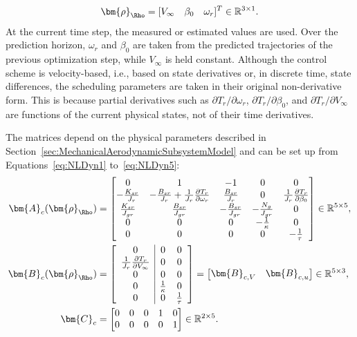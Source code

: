 \[
\bm{\rho}_\Rho = [V_{\infty} \quad \beta_0 \quad \omega_{r}]^T \in \mathbb{R}^{3 \times 1}.
\]
At the current time step, the measured or estimated values are used. Over the prediction horizon, $\omega_r$ and $\beta_0$ are taken from the predicted trajectories of the previous optimization step, while $V_{\infty}$ is held constant. Although the control scheme is velocity-based, i.e., based on state derivatives or, in discrete time, state differences, the scheduling parameters are taken in their original non-derivative form. This is because partial derivatives such as \( \partial T_r / \partial \omega_r \), \( \partial T_r / \partial \beta_0 \), and \( \partial T_r / \partial V_{\infty} \) are functions of the current physical states, not of their time derivatives.

The matrices depend on the physical parameters described in Section~\ref{sec:MechanicalAerodynamicSubsystemModel} and can be set up from Equations~\eqref{eq:NLDyn1} to~\eqref{eq:NLDyn5}:
\begin{equation}
    \begin{aligned}
        \bm{A}_c(\bm{\rho}_{\Rho}) &=
        \begin{bmatrix}
            0  & 1 & -1 & 0 & 0 \\ 
            -\frac{K_{sr}}{J_r}  & -\frac{B_{sr}}{J_r} + \frac{1}{J_r}\frac{\partial T_r}{\partial{\omega_r}} & \frac{B_{sr}}{J_r} & 0 & \frac{1}{J_r}\frac{\partial T_r}{\partial \beta_0} \\
            \frac{K_{sr}}{J_{gr}} & \frac{B_{sr}}{J_{gr}} & -\frac{B_{sr}}{J_{gr}} & -\frac{N_g}{J_{gr}} & 0 \\ 
            0 & 0 & 0 & -\frac{1}{\kappa} & 0 \\ 
            0 & 0 & 0 & 0 & -\frac{1}{\tau} 
        \end{bmatrix} \in \mathbb{R}^{5 \times 5},\\
        \bm{B}_c(\bm{\rho}_{\Rho}) &=
        \left[
        \begin{array}{c|cc}
            0 & 0 & 0 \\
            \frac{1}{J_r}\frac{\partial T_r}{\partial V_{\infty}} & 0 & 0 \\
            0 & 0 & 0 \\
            0 & \frac{1}{\kappa} & 0 \\
            0 & 0 & \frac{1}{\tau}
        \end{array}
        \right]
        =
        \begin{bmatrix}
            \bm{B}_{c,V} & \bm{B}_{c,u}
        \end{bmatrix}
        \in \mathbb{R}^{5 \times 3},\\
        \bm{C}_c &=
        \begin{bmatrix}
            0 & 0 & 0 & 1 & 0 \\
            0 & 0 & 0 & 0 & 1
        \end{bmatrix} \in \mathbb{R}^{2 \times 5}.
    \end{aligned}
\end{equation}
